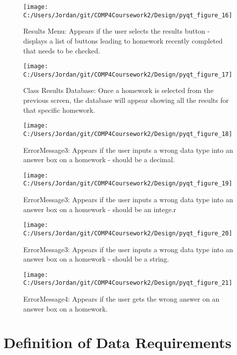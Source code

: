 \begin{figure}[H]
    \label{fig:print_function_result}\caption{Results Menu: Appears if the user selects the results button - displays a list of buttons leading to homework recently completed that needs to be checked.}
    \texttt{[image: C:/Users/Jordan/git/COMP4Coursework2/Design/pyqt\_figure\_16]}
\end{figure}

\begin{figure}[H]
    \label{fig:print_function_result}\caption{Class Results Database: Once a homework is selected from the previous screen, the database will appear showing all the results for that specific homework.}
    \texttt{[image: C:/Users/Jordan/git/COMP4Coursework2/Design/pyqt\_figure\_17]}
\end{figure}

\begin{figure}[H]
    \label{fig:print_function_result}\caption{ErrorMessage3: Appears if the user inputs a wrong data type into an answer box on a homework - should be a decimal.}
    \texttt{[image: C:/Users/Jordan/git/COMP4Coursework2/Design/pyqt\_figure\_18]}
\end{figure}

\begin{figure}[H]
    \label{fig:print_function_result}\caption{ErrorMessage3: Appears if the user inputs a wrong data type into an answer box on a homework - should be an intege.r}
    \texttt{[image: C:/Users/Jordan/git/COMP4Coursework2/Design/pyqt\_figure\_19]}
\end{figure}

\begin{figure}[H]
    \label{fig:print_function_result}\caption{ErrorMessage3: Appears if the user inputs a wrong data type into an answer box on a homework - should be a string.}
    \texttt{[image: C:/Users/Jordan/git/COMP4Coursework2/Design/pyqt\_figure\_20]}
\end{figure}

\begin{figure}[H]
    \label{fig:print_function_result}\caption{ErrorMessage4: Appears if the user gets the wrong answer on an answer box on a homework.}
    \texttt{[image: C:/Users/Jordan/git/COMP4Coursework2/Design/pyqt\_figure\_21]}
\end{figure}

\section{Definition of Data Requirements}

